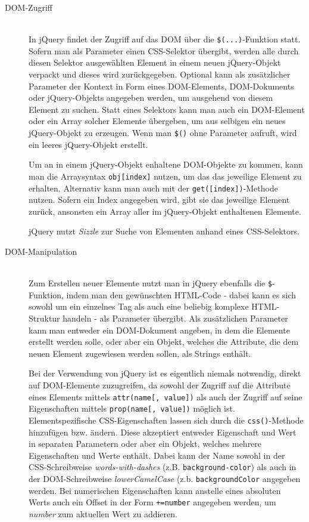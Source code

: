 \begin{description}
\item[DOM-Zugriff] \hfill \\
In jQuery findet der Zugriff auf das DOM über die \lstinline{$(...)}-Funktion statt. Sofern man als
Parameter einen CSS-Selektor übergibt, werden alle durch diesen Selektor ausgewählten Element in
einem neuen jQuery-Objekt verpackt und dieses wird zurückgegeben. Optional kann als zusätzlicher
Parameter der Kontext in Form eines DOM-Elements, DOM-Dokuments oder jQuery-Objekts angegeben
werden, um ausgehend von diesem Element zu suchen. Statt eines Selektors kann man auch ein
DOM-Element oder ein Array solcher Elemente übergeben, um aus selbigen ein neues jQuery-Objekt zu
erzeugen. Wenn man \lstinline{$()} ohne Parameter aufruft, wird ein leeres jQuery-Objekt erstellt.

Um an in einem jQuery-Objekt enhaltene DOM-Objekte zu kommen, kann man die Arraysyntax
\lstinline{obj[index]} nutzen, um das das jeweilige Element zu erhalten. Alternativ kann man auch
mit der \lstinline{get([index])}-Methode nutzen. Sofern ein Index angegeben wird, gibt sie das
jeweilige Element zurück, ansonsten ein Array aller im jQuery-Objekt enthaltenen Elemente.

jQuery nutzt \emph{Sizzle} zur Suche von Elementen anhand eines CSS-Selektors.

\item[DOM-Manipulation] \hfill \\
Zum Erstellen neuer Elemente nutzt man in jQuery ebenfalls die \lstinline{$}-Funktion, indem man den
gewünschten HTML-Code - dabei kann es sich sowohl um ein einzelnes Tag als auch eine beliebig
komplexe HTML-Struktur handeln - als Parameter übergibt. Als zusätzlichen Parameter kann man
entweder ein DOM-Dokument angeben, in dem die Elemente erstellt werden solle, oder aber ein Objekt,
welches die Attribute, die dem neuen Element zugewiesen werden sollen, als Strings enthält.

Bei der Verwendung von jQuery ist es eigentlich niemals notwendig, direkt auf DOM-Elemente
zuzugreifen, da sowohl der Zugriff auf die Attribute eines Elements mittels
\lstinline{attr(name[, value])} als auch der Zugriff auf seine Eigenschaften mittels
\lstinline{prop(name[, value])} möglich ist.
Elementspezifische CSS-Eigenschaften lassen sich durch die \lstinline{css()}-Methode hinzufügen bzw.
ändern. Diese akzeptiert entweder Eigenschaft und Wert in separaten Parametern oder aber ein Objekt,
welches mehrere Eigenschaften und Werte enthält. Dabei kann der Name sowohl in der CSS-Schreibweise
\emph{words-with-dashes} (z.B. \lstinline{background-color}) als auch in der DOM-Schreibweise
\emph{lowerCamelCase} (z.b. \lstinline{backgroundColor} angegeben werden. Bei numerischen
Eigenschaften kann anstelle eines absoluten Werts auch ein Offset in der Form \lstinline{+=number}
angegeben werden, um \emph{number} zum aktuellen Wert zu addieren.


\end{description}
